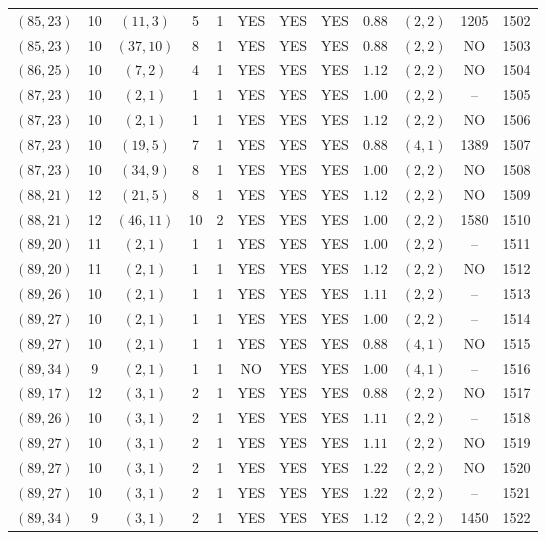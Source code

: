 \begin{longtable}{|c|c|c|c|c|c|c|c|c|c|c|c|}
$(85,23)$ & 10 & $(11,3)$ & 5 & 1 & YES & YES & YES & $0.88$ & $(2,2)$ & 1205 & 1502\\
$(85,23)$ & 10 & $(37,10)$ & 8 & 1 & YES & YES & YES & $0.88$ & $(2,2)$ & NO & 1503\\
$(86,25)$ & 10 & $(7,2)$ & 4 & 1 & YES & YES & YES & $1.12$ & $(2,2)$ & NO & 1504\\
$(87,23)$ & 10 & $(2,1)$ & 1 & 1 & YES & YES & YES & $1.00$ & $(2,2)$ & -- & 1505\\
$(87,23)$ & 10 & $(2,1)$ & 1 & 1 & YES & YES & YES & $1.12$ & $(2,2)$ & NO & 1506\\
$(87,23)$ & 10 & $(19,5)$ & 7 & 1 & YES & YES & YES & $0.88$ & $(4,1)$ & 1389 & 1507\\
$(87,23)$ & 10 & $(34,9)$ & 8 & 1 & YES & YES & YES & $1.00$ & $(2,2)$ & NO & 1508\\
$(88,21)$ & 12 & $(21,5)$ & 8 & 1 & YES & YES & YES & $1.12$ & $(2,2)$ & NO & 1509\\
$(88,21)$ & 12 & $(46,11)$ & 10 & 2 & YES & YES & YES & $1.00$ & $(2,2)$ & 1580 & 1510\\
$(89,20)$ & 11 & $(2,1)$ & 1 & 1 & YES & YES & YES & $1.00$ & $(2,2)$ & -- & 1511\\
$(89,20)$ & 11 & $(2,1)$ & 1 & 1 & YES & YES & YES & $1.12$ & $(2,2)$ & NO & 1512\\
$(89,26)$ & 10 & $(2,1)$ & 1 & 1 & YES & YES & YES & $1.11$ & $(2,2)$ & -- & 1513\\
$(89,27)$ & 10 & $(2,1)$ & 1 & 1 & YES & YES & YES & $1.00$ & $(2,2)$ & -- & 1514\\
$(89,27)$ & 10 & $(2,1)$ & 1 & 1 & YES & YES & YES & $0.88$ & $(4,1)$ & NO & 1515\\
$(89,34)$ & 9 & $(2,1)$ & 1 & 1 & NO & YES & YES & $1.00$ & $(4,1)$ & -- & 1516\\
$(89,17)$ & 12 & $(3,1)$ & 2 & 1 & YES & YES & YES & $0.88$ & $(2,2)$ & NO & 1517\\
$(89,26)$ & 10 & $(3,1)$ & 2 & 1 & YES & YES & YES & $1.11$ & $(2,2)$ & -- & 1518\\
$(89,27)$ & 10 & $(3,1)$ & 2 & 1 & YES & YES & YES & $1.11$ & $(2,2)$ & NO & 1519\\
$(89,27)$ & 10 & $(3,1)$ & 2 & 1 & YES & YES & YES & $1.22$ & $(2,2)$ & NO & 1520\\
$(89,27)$ & 10 & $(3,1)$ & 2 & 1 & YES & YES & YES & $1.22$ & $(2,2)$ & -- & 1521\\
$(89,34)$ & 9 & $(3,1)$ & 2 & 1 & YES & YES & YES & $1.12$ & $(2,2)$ & 1450 & 1522\\

\end{longtable}
